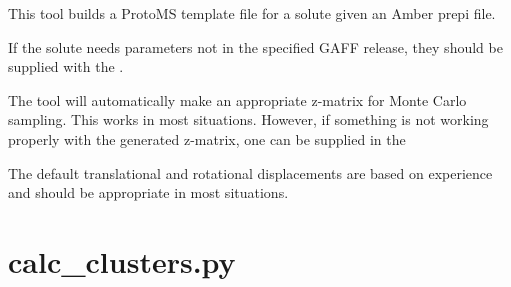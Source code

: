 \documentclass[letterpaper,10pt,english]{sphinxmanual}
\begin{document}

%
\begin{sphinxVerbatim}[commandchars=\\\{\}]
  
    
        
        
\end{sphinxVerbatim}


This tool builds a ProtoMS template file for a solute given an Amber prepi file.

If the solute needs parameters not in the specified GAFF release, they should be supplied with the .

The tool will automatically make an appropriate z-matrix for Monte Carlo sampling. This works in most situations. However, if something is not working properly with the generated z-matrix, one can be supplied in the 

The default translational and rotational displacements are based on experience and should be appropriate in most situations.


\section{calc\_clusters.py}
\label{\detokenize{tools:calc-clusters-py}}
%
\begin{sphinxVerbatim}[commandchars=\\\{\}]
  \PYG{p}{[}\PYG{p}{]} \PYG{p}{[} \PYG{p}{]} \PYG{p}{[} \PYG{p}{]} \PYG{p}{[} \PYG{p}{]} \PYG{p}{[} \PYG{p}{]}
                        \PYG{p}{[} \PYG{p}{]} \PYG{p}{[} \PYG{p}{]} \PYG{p}{[} \PYG{p}{]}
\end{sphinxVerbatim}
\end{document}
